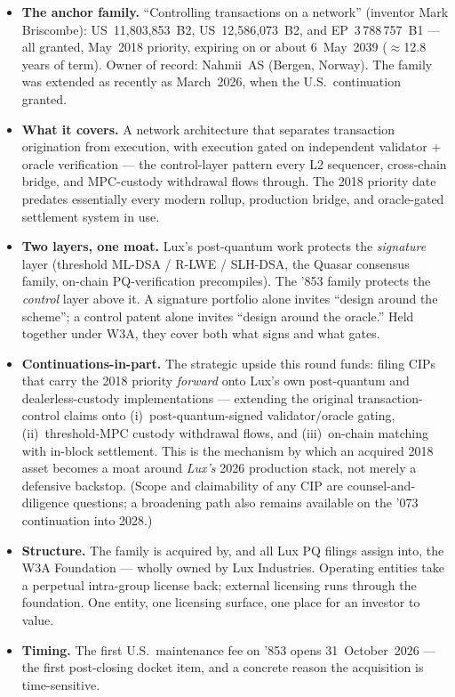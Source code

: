 \documentclass[11pt,a4paper]{article}
\begin{document}
\begin{itemize}[leftmargin=1.4em]
  \item \textbf{The anchor family.} ``Controlling transactions on a
  network'' (inventor Mark Briscombe): US~11,803,853~B2, US~12,586,073~B2,
  and EP~3\,788\,757~B1 --- all granted, May~2018 priority, expiring on or
  about 6~May~2039 (\(\approx\)12.8 years of term). Owner of record:
  Nahmii~AS (Bergen, Norway). The family was extended as recently as
  March~2026, when the U.S.\ continuation granted.
  \item \textbf{What it covers.} A network architecture that separates
  transaction origination from execution, with execution gated on
  independent validator + oracle verification --- the control-layer pattern
  every L2 sequencer, cross-chain bridge, and MPC-custody withdrawal flows
  through. The 2018 priority date predates essentially every modern rollup,
  production bridge, and oracle-gated settlement system in use.
  \item \textbf{Two layers, one moat.} Lux's post-quantum work protects the
  \emph{signature} layer (threshold ML-DSA / R-LWE / SLH-DSA, the Quasar
  consensus family, on-chain PQ-verification precompiles). The '853 family
  protects the \emph{control} layer above it. A signature portfolio alone
  invites ``design around the scheme''; a control patent alone invites
  ``design around the oracle.'' Held together under W3A, they cover both
  what signs and what gates.
  \item \textbf{Continuations-in-part.} The strategic upside this round
  funds: filing CIPs that carry the 2018 priority \emph{forward} onto Lux's
  own post-quantum and dealerless-custody implementations --- extending the
  original transaction-control claims onto (i)~post-quantum-signed
  validator/oracle gating, (ii)~threshold-MPC custody withdrawal flows, and
  (iii)~on-chain matching with in-block settlement. This is the mechanism by
  which an acquired 2018 asset becomes a moat around \emph{Lux's} 2026
  production stack, not merely a defensive backstop. (Scope and claimability
  of any CIP are counsel-and-diligence questions; a broadening path also
  remains available on the '073 continuation into 2028.)
  \item \textbf{Structure.} The family is acquired by, and all Lux PQ
  filings assign into, the W3A Foundation --- wholly owned by Lux
  Industries. Operating entities take a perpetual intra-group license back;
  external licensing runs through the foundation. One entity, one licensing
  surface, one place for an investor to value.
  \item \textbf{Timing.} The first U.S.\ maintenance fee on '853 opens
  31~October~2026 --- the first post-closing docket item, and a concrete
  reason the acquisition is time-sensitive.
\end{itemize}
\end{document}
